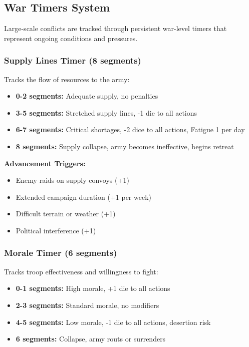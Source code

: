 \documentclass[11pt,letterpaper]{article}
\begin{document}
\subsection{War Timers System}

Large-scale conflicts are tracked through persistent war-level timers that represent ongoing conditions and pressures.

\subsubsection{Supply Lines Timer (8 segments)}

Tracks the flow of resources to the army:
\begin{itemize}[leftmargin=*]
    \item \textbf{0-2 segments:} Adequate supply, no penalties
    \item \textbf{3-5 segments:} Stretched supply lines, -1 die to all actions
    \item \textbf{6-7 segments:} Critical shortages, -2 dice to all actions, Fatigue 1 per day
    \item \textbf{8 segments:} Supply collapse, army becomes ineffective, begins retreat
\end{itemize}

\textbf{Advancement Triggers:}
\begin{itemize}[leftmargin=*]
    \item Enemy raids on supply convoys (+1)
    \item Extended campaign duration (+1 per week)
    \item Difficult terrain or weather (+1)
    \item Political interference (+1)
\end{itemize}

\subsubsection{Morale Timer (6 segments)}

Tracks troop effectiveness and willingness to fight:
\begin{itemize}[leftmargin=*]
    \item \textbf{0-1 segments:} High morale, +1 die to all actions
    \item \textbf{2-3 segments:} Standard morale, no modifiers
    \item \textbf{4-5 segments:} Low morale, -1 die to all actions, desertion risk
    \item \textbf{6 segments:} Collapse, army routs or surrenders
\end{itemize}
\end{document}
